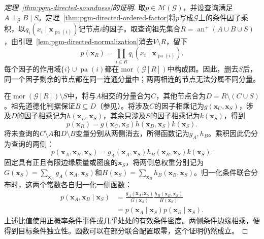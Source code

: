 \begin{proof}[定理~\ref{thm:pgm-directed-soundness}的证明]
取$p\in\mathcal{M}(\mathcal{G})$，并设查询满足$A\perp_{\mathcal{G}}B\mid S$。定理~\ref{thm:pgm-directed-ordered-factor}将$p$写成$\mathcal{G}$上的条件因子乘积，以$q_i(x_i\mid\bm{x}_{\operatorname{pa}(i)})$记节点$i$的因子。取查询祖先集合$R=\operatorname{an}^{+}(A\cup B\cup S)$，由引理~\ref{lem:pgm-directed-normalization}消去$V\setminus R$，留下
\[
  p(\bm{x}_R)=
  \prod_{i\in R}q_i(x_i\mid\bm{x}_{\operatorname{pa}(i)}).
\]
每个因子的作用域$\{i\}\cup\operatorname{pa}(i)$都在$\operatorname{mor}(\mathcal{G}[R])$中构成团。因此，删去$S$后，同一个因子剩余的节点都在同一连通分量中；两两相连的节点无法分属不同分量。

在$\operatorname{mor}(\mathcal{G}[R])\setminus S$中，将与$A$相交的分量合为$C$，其他节点合为$D=R\setminus(C\cup S)$。祖先道德化判据保证$B\subseteq D$（参见）。将涉及$C$的因子相乘记为$g(\bm{x}_C,\bm{x}_S)$，涉及$D$的因子相乘记为$h(\bm{x}_D,\bm{x}_S)$，其余只涉及$S$的因子相乘记为$k(\bm{x}_S)$，得到
\[
  p(\bm{x}_R)=
  g(\bm{x}_C,\bm{x}_S)
  h(\bm{x}_D,\bm{x}_S)
  k(\bm{x}_S).
\]
将未查询的$C\setminus A$和$D\setminus B$变量分别从两侧消去，所得函数记为$g_A,h_B$。乘积因此仍分为查询的两侧：
\[
  p(\bm{x}_A,\bm{x}_B,\bm{x}_S)=
  g_A(\bm{x}_A,\bm{x}_S)
  h_B(\bm{x}_B,\bm{x}_S)
  k(\bm{x}_S).
\]
固定具有正且有限边缘质量或密度的$\bm{x}_S$，将两侧总权重分别记为$G(\bm{x}_S)=\sum_{\bm{x}_A}g_A(\bm{x}_A,\bm{x}_S)$和$H(\bm{x}_S)=\sum_{\bm{x}_B}h_B(\bm{x}_B,\bm{x}_S)$。归一化条件联合分布时，这两个常数各自归一化一侧函数：
\[
  \begin{aligned}
    p(\bm{x}_A,\bm{x}_B\mid\bm{x}_S)
      &=\frac{g_A(\bm{x}_A,\bm{x}_S)}{G(\bm{x}_S)}
        \frac{h_B(\bm{x}_B,\bm{x}_S)}{H(\bm{x}_S)}\\
      &=p(\bm{x}_A\mid\bm{x}_S)
        p(\bm{x}_B\mid\bm{x}_S).
  \end{aligned}
\]
上述比值使用正概率条件事件或几乎处处的有效条件密度。两侧条件边缘相乘，便得到目标条件独立性。函数可以在部分联合配置取零，这个证明仍然成立。
\end{proof}

